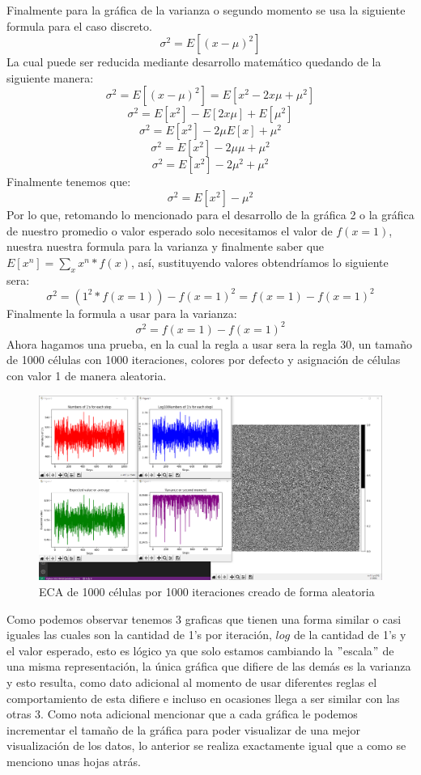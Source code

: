 \documentclass[11pt]{article}
\begin{document}
 		Finalmente para la gráfica de la varianza o segundo momento se usa la siguiente formula para el caso discreto. \[ \sigma^2 =  E[(x-\mu)^2]\] La cual puede ser reducida mediante desarrollo matemático quedando de la siguiente manera: \[ \sigma^2 =  E[(x-\mu)^2] = E[x^2-2x\mu+\mu^2]\]        \[ \sigma^2 = E[x^2]-E[2x\mu]+E[\mu^2]\]	\[ \sigma^2 = E[x^2]-2\mu E[x]+\mu^2\]						\[ \sigma^2 = E[x^2]-2\mu\mu+\mu^2\]	\[ \sigma^2 = E[x^2]-2\mu^2+\mu^2\] Finalmente tenemos que: 	\[ \sigma^2 = E[x^2]-\mu^2\]
 		Por lo que, retomando lo mencionado para el desarrollo de la gráfica 2 o la gráfica de nuestro promedio o valor esperado solo necesitamos el valor de $f(x=1)$, nuestra nuestra formula para la varianza y finalmente saber que $E[x^n] =  \sum_{x} x^n *f(x) $, así, sustituyendo valores obtendríamos lo siguiente sera: \[ \sigma^2 = (1^2*f(x=1)) - f(x=1)^2 = f(x=1) - f(x=1)^2 \] Finalmente la formula a usar para la varianza: \[ \sigma^2 = f(x=1) - f(x=1)^2 \]
 		Ahora hagamos una prueba, en la cual la regla a usar sera la regla 30, un tamaño de 1000 células con 1000 iteraciones, colores por defecto y asignación de células con valor 1 de manera aleatoria.
 		\begin{figure}[H]
			\centering
			\includegraphics[scale=0.35]{resources/pruebaF1.png}
			\caption{ECA de 1000 células por 1000 iteraciones creado de forma aleatoria}\label{fig:picture}
		\end{figure}
		Como podemos observar tenemos 3 graficas que tienen una forma similar o casi iguales las cuales son la cantidad de 1's por iteración, $log$ de la cantidad de 1's y el valor esperado, esto es lógico ya que solo estamos cambiando la $"$escala$"$ de una misma representación, la única gráfica que difiere de las demás es la varianza y esto resulta, como dato adicional al momento de usar diferentes reglas el comportamiento de esta difiere e incluso en ocasiones llega a ser similar con las otras 3. Como nota adicional mencionar que a cada gráfica le podemos incrementar el tamaño de la gráfica para poder visualizar de una mejor visualización de los datos, lo anterior se realiza exactamente igual que a como se menciono unas hojas atrás.\par
\end{document}
